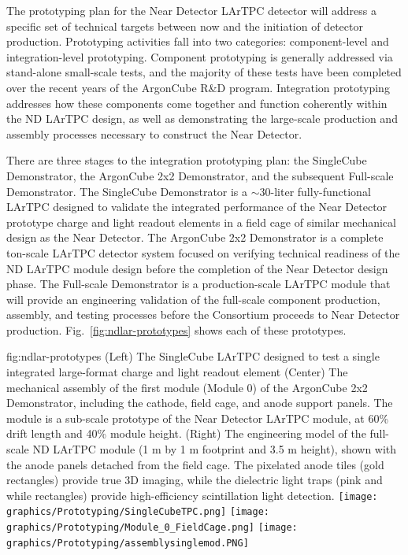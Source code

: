 The prototyping plan for the Near Detector LArTPC detector will address a specific set of technical targets between now and the initiation of detector production.  
Prototyping activities fall into two categories: component-level and integration-level prototyping.  
Component prototyping is generally addressed via stand-alone small-scale tests, and the majority of these tests have been completed over the recent years of the ArgonCube R\&D program.
Integration prototyping addresses how these components come together and function coherently within the ND LArTPC design, as well as demonstrating the large-scale production and assembly processes necessary to construct the Near Detector.

There are three stages to the integration prototyping plan: the SingleCube Demonstrator, the ArgonCube 2x2 Demonstrator, and the subsequent Full-scale Demonstrator.
The SingleCube Demonstrator is a $\sim$30-liter fully-functional LArTPC designed to validate the integrated performance of the Near Detector prototype charge and light readout elements in a field cage of similar mechanical design as the Near Detector.
The ArgonCube 2x2 Demonstrator is a complete ton-scale LArTPC detector system focused on verifying technical readiness of the ND LArTPC module design before the completion of the Near Detector design phase.
The Full-scale Demonstrator is a production-scale LArTPC module that will provide an engineering validation of the full-scale component production, assembly, and testing processes before the Consortium proceeds to Near Detector production.
Fig.~\ref{fig:ndlar-prototypes} shows each of these prototypes.

\begin{dunefigure}{fig:ndlar-prototypes}
{(Left) The SingleCube LArTPC designed to test a single integrated large-format charge and light readout element (Center) The mechanical assembly of the first module (Module 0) of the ArgonCube 2x2 Demonstrator, including the cathode, field cage, and anode support panels.  The module is a sub-scale prototype of the Near Detector LArTPC module, at 60\% drift length and 40\% module height.  (Right) The engineering model of the full-scale ND LArTPC module (1 m by 1 m footprint and 3.5 m height), shown with the anode panels detached from the field cage.  The pixelated anode tiles (gold rectangles) provide true 3D imaging, while the dielectric light traps (pink and while rectangles) provide high-efficiency scintillation light detection.}
\texttt{[image: graphics/Prototyping/SingleCubeTPC.png]}
\texttt{[image: graphics/Prototyping/Module\_0\_FieldCage.png]}
\texttt{[image: graphics/Prototyping/assemblysinglemod.PNG]}
\end{dunefigure}

